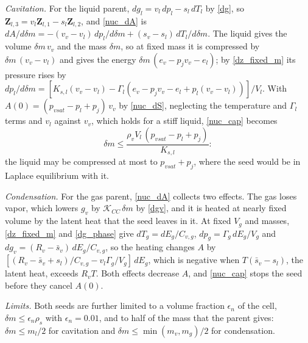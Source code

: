 \emph{Cavitation.} For the liquid parent, $dg_l=v_l\,dp_l-s_l\,dT_l$ by \eqref{dg}, so $\boldsymbol{Z}_{l,3}=v_l\boldsymbol{Z}_{l,1}-s_l\boldsymbol{Z}_{l,2}$, and \eqref{nuc_dA} is $dA/d\delta m=-(v_v-v_l)\,dp_l/d\delta m+(s_v-s_l)\,dT_l/d\delta m$. The liquid gives the volume $\delta m\,v_v$ and the mass $\delta m$, so at fixed mass it is compressed by $\delta m\,(v_v-v_l)$ and gives the energy $\delta m\,(e_v-p_{j}v_v-e_l)$; by \eqref{dz_fixed_m} its pressure rises by $dp_l/d\delta m=[K_{s,l}(v_v-v_l)-\Gamma_l(e_v-p_{j}v_v-e_l+p_l(v_v-v_l))]/V_l$. With $A(0)=(p_{vsat}-p_l+p_{j})\,v_v$ by \eqref{nuc_dS}, neglecting the temperature and $\Gamma_l$ terms and $v_l$ against $v_v$, which holds for a stiff liquid, \eqref{nuc_cap} becomes
\begin{equation}\label{nuc_cap_cav}
\delta m\le\frac{\rho_vV_l\,(p_{vsat}-p_l+p_{j})}{K_{s,l}}:
\end{equation}
the liquid may be compressed at most to $p_{vsat}+p_{j}$, where the seed would be in Laplace equilibrium with it.

\emph{Condensation.} For the gas parent, \eqref{nuc_dA} collects two effects. The gas loses vapor, which lowers $g_v$ by $\mathcal{K}_{CC}\,\delta m$ by \eqref{dgv}, and it is heated at nearly fixed volume by the latent heat that the seed leaves in it. At fixed $V_g$ and masses, \eqref{dz_fixed_m} and \eqref{dg_phase} give $dT_g=dE_g/C_{v,g}$, $dp_g=\Gamma_g\,dE_g/V_g$ and $dg_v=(R_v-\bar s_v)\,dE_g/C_{v,g}$, so the heating changes $A$ by $[(R_v-\bar s_v+s_l)/C_{v,g}-v_l\Gamma_g/V_g]\,dE_g$, which is negative when $T(\bar s_v-s_l)$, the latent heat, exceeds $R_vT$. Both effects decrease $A$, and \eqref{nuc_cap} stops the seed before they cancel $A(0)$.

\emph{Limits.} Both seeds are further limited to a volume fraction $\epsilon_n$ of the cell, $\delta m\le\epsilon_n\rho_s$ with $\epsilon_n=0.01$, and to half of the mass that the parent gives: $\delta m\le m_l/2$ for cavitation and $\delta m\le\min(m_v,m_g)/2$ for condensation.

